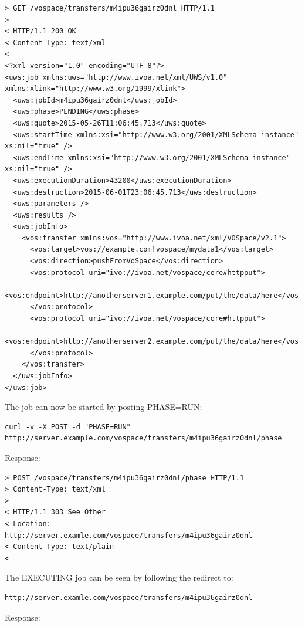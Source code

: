 \documentclass[11pt,a4paper]{ivoa}
\begin{document}
\begin{lstlisting}
> GET /vospace/transfers/m4ipu36gairz0dnl HTTP/1.1
>
< HTTP/1.1 200 OK
< Content-Type: text/xml
<
<?xml version="1.0" encoding="UTF-8"?>
<uws:job xmlns:uws="http://www.ivoa.net/xml/UWS/v1.0" xmlns:xlink="http://www.w3.org/1999/xlink">
  <uws:jobId>m4ipu36gairz0dnl</uws:jobId>
  <uws:phase>PENDING</uws:phase>
  <uws:quote>2015-05-26T11:06:45.713</uws:quote>
  <uws:startTime xmlns:xsi="http://www.w3.org/2001/XMLSchema-instance" xs:nil="true" />
  <uws:endTime xmlns:xsi="http://www.w3.org/2001/XMLSchema-instance" xs:nil="true" />
  <uws:executionDuration>43200</uws:executionDuration>
  <uws:destruction>2015-06-01T23:06:45.713</uws:destruction>
  <uws:parameters />
  <uws:results />
  <uws:jobInfo>
    <vos:transfer xmlns:vos="http://www.ivoa.net/xml/VOSpace/v2.1">
      <vos:target>vos://example.com!vospace/mydata1</vos:target>
      <vos:direction>pushFromVoSpace</vos:direction>
      <vos:protocol uri="ivo://ivoa.net/vospace/core#httpput">
        <vos:endpoint>http://anotherserver1.example.com/put/the/data/here</vos:endpoint>
      </vos:protocol>
      <vos:protocol uri="ivo://ivoa.net/vospace/core#httpput">
        <vos:endpoint>http://anotherserver2.example.com/put/the/data/here</vos:endpoint>
      </vos:protocol>
    </vos:transfer>
  </uws:jobInfo>
</uws:job>
\end{lstlisting}
The job can now be started by posting PHASE=RUN:
\begin{lstlisting}
curl -v -X POST -d "PHASE=RUN" http://server.example.com/vospace/transfers/m4ipu36gairz0dnl/phase
\end{lstlisting}
Response:
\begin{lstlisting}
> POST /vospace/transfers/m4ipu36gairz0dnl/phase HTTP/1.1
> Content-Type: text/xml
>
< HTTP/1.1 303 See Other
< Location: http://server.examle.com/vospace/transfers/m4ipu36gairz0dnl
< Content-Type: text/plain
<
\end{lstlisting}
The EXECUTING job can be seen by following the redirect to:
\begin{lstlisting}
http://server.examle.com/vospace/transfers/m4ipu36gairz0dnl
\end{lstlisting}
Response:
\end{document}
